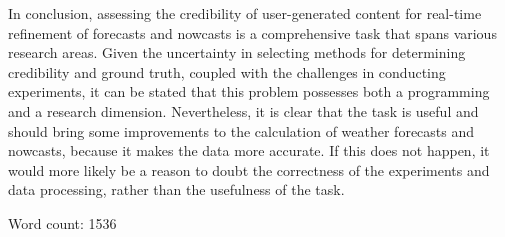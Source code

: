 \documentclass[conference]{IEEEtran}
\begin{document}
In conclusion, assessing the credibility of user-generated content for real-time refinement of forecasts and nowcasts is a comprehensive task that spans various research areas. Given the uncertainty in selecting methods for determining credibility and ground truth, coupled with the challenges in conducting experiments, it can be stated that this problem possesses both a programming and a research dimension. Nevertheless, it is clear that the task is useful and should bring some improvements to the calculation of weather forecasts and nowcasts, because it makes the data more accurate. If this does not happen, it would more likely be a reason to doubt the correctness of the experiments and data processing, rather than the usefulness of the task.




Word count: 1536
\end{document}
